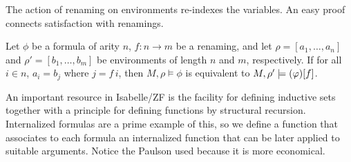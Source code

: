 The action of renaming on environments re-indexes the variables. An
easy proof connects satisfaction with renamings.
\begin{lemma}
  \label{lem:renaming}
  Let $\phi$ be a formula of arity $n$, $f \colon n \to m$ be a
  renaming, and let $\rho=[a_1,\ldots,a_n]$ and
  $\rho'=[b_1,\ldots,b_m]$ be environments of length $n$ and $m$,
  respectively. If for all $i \in n$, $a_i = b_{j}$ where $j=f\,i$,
  then $M,\rho\models \phi$ is equivalent to
  $M,\rho' \models (\varphi)[f]$.
\end{lemma}

An important resource in Isabelle/ZF is the facility for defining
inductive sets \cite{paulson2000fixedpoint,paulson1995set} together
with a principle for defining functions by structural recursion.
Internalized formulas are a prime example of this, so we define
a function  that associates to each formula an internalized
function that can be later applied to suitable arguments. Notice the
Paulson used  because it is more economical.
